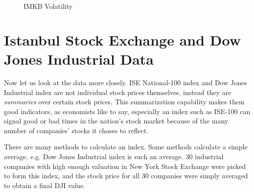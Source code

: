 \begin{figure}[!hbp]
\caption{IMKB Volatility}
\vspace{0.6cm}
\end{figure}


\section{Istanbul Stock Exchange and Dow Jones Industrial Data}

Now let us look at the data more closely. ISE National-100 index and Dow Jones
Industrial index are not individual stock prices themselves, instead they are
{\em summaries} over certain stock prices. This summarization capability makes
them good indicators, as economists like to say, especially an index such as
ISE-100 can signal good or bad times in the nation's stock market because of the
many number of companies' stocks it choses to reflect.

There are many methods to calculate an index. Some methods calculate a simple
average, e.g. Dow Jones Industrial index is such an average. 30 industrial
companies with high enough valuation in New York Stock Exchange were picked to
form this index, and the stock price for all 30 companies were simply averaged
to obtain a final DJI value.

